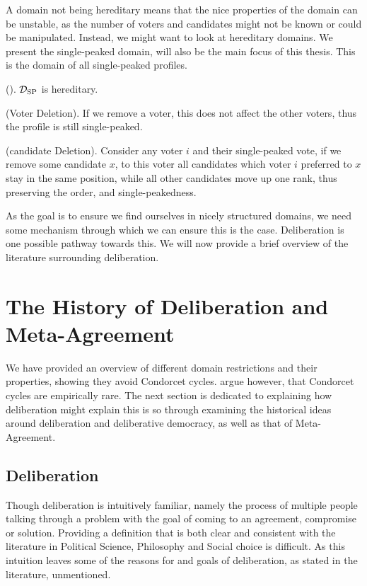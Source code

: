 A domain not being hereditary means that the nice properties of the domain can be unstable, as the number of voters and candidates might not be known or could be manipulated. Instead, we might want to look at hereditary domains. We present the single-peaked domain, will also be the main focus of this thesis. This is the domain of all single-peaked profiles.


\begin{proposition}{\textnormal{(\citet{elkindPreferenceRestrictionsComputational2022}).}}
	$\mathcal{D}_{\textnormal{SP}}$ is hereditary.
\end{proposition}

\begin{proofc}
	(Voter Deletion). If we remove a voter, this does not affect the other voters, thus the profile is still single-peaked.~\checkmark

	(candidate Deletion). Consider any voter $i$ and their single-peaked vote, if we remove some candidate $x$, to this voter all candidates which voter $i$ preferred to $x$ stay in the same position, while all other candidates move up one rank, thus preserving the order, and single-peakedness.~\checkmark
\end{proofc}


As the goal is to ensure we find ourselves in nicely structured domains, we
need some mechanism through which we can ensure this is the case. Deliberation
is one possible pathway towards this. We will now provide a brief overview of the
literature surrounding deliberation.

\section{The History of Deliberation and Meta-Agreement}

We have provided an overview of different domain restrictions and their
properties, showing they avoid Condorcet cycles.
\citet{bochslerMarquisCondorcetGoes2010} argue however, that Condorcet cycles
are empirically rare. The next section is dedicated to explaining how
deliberation might explain this is so through examining the historical ideas
around deliberation and deliberative democracy, as well as that of
Meta-Agreement.

\subsection{Deliberation}

Though deliberation is intuitively familiar, namely
the process of multiple people talking through a problem with the goal of
coming to an agreement, compromise or solution. Providing a definition that is
both clear and consistent with the literature in Political Science, Philosophy
and Social choice is difficult.  As this intuition leaves some of the reasons for
and goals of deliberation, as stated in the literature, unmentioned.


